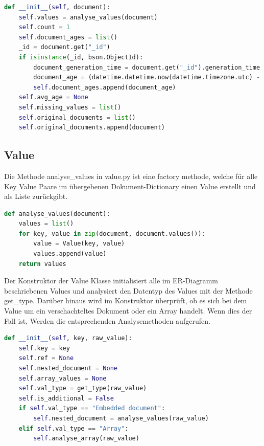 \begin{lstlisting}[language=python, caption={ProcessedDocument.\_\_init\_\_},label={lst:backend_processed_document_init}]
def __init__(self, document):
    self.values = analyse_values(document)
    self.count = 1
    self.document_ages = list()
    _id = document.get("_id")
    if isinstance(_id, bson.ObjectId):
        document_generation_time = document.get("_id").generation_time
        document_age = (datetime.datetime.now(datetime.timezone.utc) - document_generation_time).total_seconds()
        self.document_ages.append(document_age)
    self.avg_age = None
    self.missing_values = list()
    self.original_documents = list()
    self.original_documents.append(document)
\end{lstlisting}

\subsection{Value}
\label{sub:ba_value}

Die Methode analyse\_values in value.py ist eine factory methode, welche für alle Key Value Paare im übergebenen Dokument-Dictionary einen Value erstellt und als Liste zurückgibt.

\begin{lstlisting}[language=python, caption={Value.analyse\_values},label={lst:backend_value_analyse_values}]
def analyse_values(document):
    values = list()
    for key, value in zip(document, document.values()):
        value = Value(key, value)
        values.append(value)
    return values
\end{lstlisting}

Der Konstruktor der Value Klasse initialisiert alle im ER-Diagramm beschriebenen Values und analysiert den Datentyp des Values mit der Methode get\_type.
Darüber hinaus wird im Konstruktor überprüft, ob es sich bei dem Value um ein verschachteltes Dokument oder ein Array handelt. 
Wenn dies der Fall ist, Werden die entsprechenden Analysemethoden aufgerufen.

\begin{lstlisting}[language=python, caption={Value.\_\_init\_\_},label={lst:backend_value_init}]
def __init__(self, key, raw_value):
    self.key = key
    self.ref = None
    self.nested_document = None
    self.array_values = None
    self.val_type = get_type(raw_value)
    self.is_additional = False
    if self.val_type == "Embedded document":
        self.nested_document = analyse_values(raw_value)
    elif self.val_type == "Array":
        self.analyse_array(raw_value)
\end{lstlisting}

